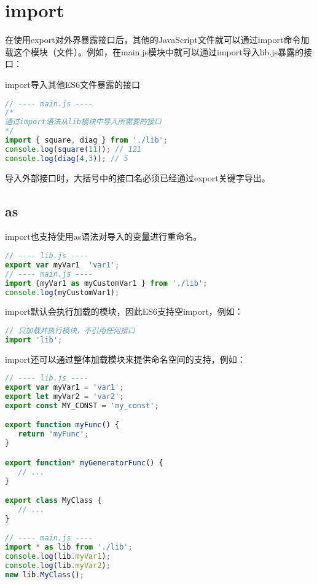 \section{import}

在使用export对外界暴露接口后，其他的JavaScript文件就可以通过import命令加载这个模块（文件）。例如，在main.js模块中就可以通过import导入lib.js暴露的接口：


\begin{example}
import导入其他ES6文件暴露的接口
\begin{lstlisting}[language=JavaScript]
// ---- main.js ----
/* 
通过import语法从lib模块中导入所需要的接口
*/
import { square, diag } from './lib';
console.log(square(11)); // 121
console.log(diag(4,3)); // 5
\end{lstlisting}
\end{example}

导入外部接口时，大括号中的接口名必须已经通过export关键字导出。


\subsection{as}

import也支持使用as语法对导入的变量进行重命名。


\begin{lstlisting}[language=JavaScript]
// ---- lib.js ----
export var myVar1  'var1';
// ---- main.js ----
import {myVar1 as myCustomVar1 } from './lib';
console.log(myCustomVar1);
\end{lstlisting}

import默认会执行加载的模块，因此ES6支持空import，例如：


\begin{lstlisting}[language=JavaScript]
// 只加载并执行模块，不引用任何接口
import 'lib';
\end{lstlisting}

import还可以通过整体加载模块来提供命名空间的支持，例如：



\begin{lstlisting}[language=JavaScript]
// ---- lib.js ----
export var myVar1 = 'var1';
export let myVar2 = 'var2';
export const MY_CONST = 'my_const';

export function myFunc() {
   return 'myFunc';
}

export function* myGeneratorFunc() {
   // ...
}

export class MyClass {
   // ...
}

// ---- main.js ----
import * as lib from './lib';
console.log(lib.myVar1);
console.log(lib.myVar2);
new lib.MyClass();
\end{lstlisting}

